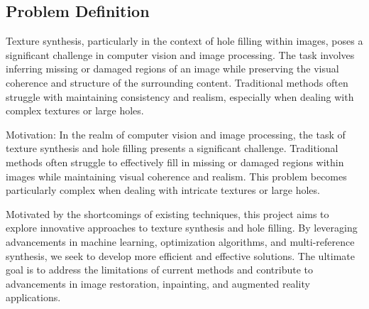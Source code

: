 \begin{introduction}

\section{Problem Definition}

Texture synthesis, particularly in the context of hole filling within images, poses a significant challenge in computer vision and image processing. The task involves inferring missing or damaged regions of an image while preserving the visual coherence and structure of the surrounding content. Traditional methods often struggle with maintaining consistency and realism, especially when dealing with complex textures or large holes.



Motivation: In the realm of computer vision and image processing, the task of texture synthesis and hole filling presents a significant challenge. Traditional methods often struggle to effectively fill in missing or damaged regions within images while maintaining visual coherence and realism. This problem becomes particularly complex when dealing with intricate textures or large holes.

Motivated by the shortcomings of existing techniques, this project aims to explore innovative approaches to texture synthesis and hole filling. By leveraging advancements in machine learning, optimization algorithms, and multi-reference synthesis, we seek to develop more efficient and effective solutions. The ultimate goal is to address the limitations of current methods and contribute to advancements in image restoration, inpainting, and augmented reality applications.

\end{introduction}
